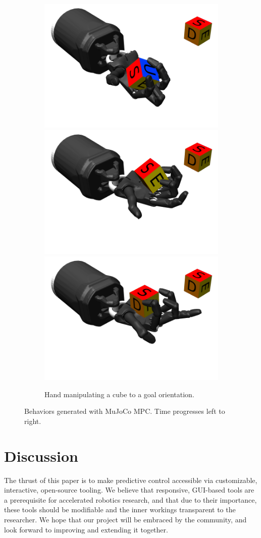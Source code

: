\begin{figure}[H]
\begin{subfigure}{0.98\textwidth}
		\includegraphics[width=.225\textwidth]{predictive_sampling/hand_2.png}%
		\includegraphics[width=.225\textwidth]{predictive_sampling/hand_3.png}%
		\includegraphics[width=.225\textwidth]{predictive_sampling/hand_4.png}%
		\caption{Hand manipulating a cube to a goal orientation.}
		\label{ps_hand}
	\end{subfigure}
	\caption[Behaviors generated with MuJoCo MPC]{Behaviors generated with MuJoCo MPC. Time progresses left to right.}
	\label{ps_examples}
\end{figure}

\section{Discussion} \label{ps_discussion}
The thrust of this paper is to make predictive control accessible via customizable, interactive, open-source tooling. We believe that responsive, GUI-based tools are a prerequisite for accelerated robotics research, and that due to their importance, these tools should be modifiable and the inner workings transparent to the researcher. We hope that our \app{} project will be embraced by the community, and look forward to improving and extending it together.

